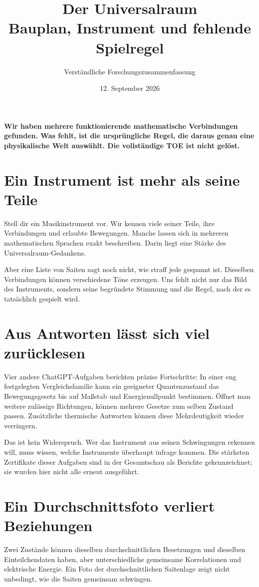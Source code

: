 \documentclass[10pt,a4paper]{article}
\title{Der Universalraum\\Bauplan, Instrument und fehlende Spielregel}
\author{Verständliche Forschungszusammenfassung}
\date{12. September 2026}
\begin{document}
\maketitle
\textbf{Wir haben mehrere funktionierende mathematische Verbindungen
gefunden. Was fehlt, ist die ursprüngliche Regel, die daraus genau eine
physikalische Welt auswählt. Die vollständige TOE ist nicht gelöst.}

\section*{Ein Instrument ist mehr als seine Teile}
Stell dir ein Musikinstrument vor. Wir kennen viele seiner Teile, ihre
Verbindungen und erlaubte Bewegungen. Manche lassen sich in mehreren
mathematischen Sprachen exakt beschreiben. Darin liegt eine Stärke des
Universalraum-Gedankens.

Aber eine Liste von Saiten sagt noch nicht, wie straff jede gespannt ist.
Dieselben Verbindungen können verschiedene Töne erzeugen. Uns fehlt nicht
nur das Bild des Instruments, sondern seine begründete Stimmung und die
Regel, nach der es tatsächlich gespielt wird.

\section*{Aus Antworten lässt sich viel zurücklesen}
Vier andere ChatGPT-Aufgaben berichten präzise Fortschritte: In einer eng
festgelegten Vergleichsfamilie kann ein geeigneter Quantenzustand das
Bewegungsgesetz bis auf Maßstab und Energienullpunkt bestimmen. Öffnet man
weitere zulässige Richtungen, können mehrere Gesetze zum selben Zustand
passen. Zusätzliche thermische Antworten können diese Mehrdeutigkeit wieder
verringern.

Das ist kein Widerspruch. Wer das Instrument aus seinen Schwingungen
erkennen will, muss wissen, welche Instrumente überhaupt infrage kommen.
Die stärksten Zertifikate dieser Aufgaben sind in der Gesamtschau als
Berichte gekennzeichnet; sie wurden hier nicht alle erneut ausgeführt.

\section*{Ein Durchschnittsfoto verliert Beziehungen}
Zwei Zustände können dieselben durchschnittlichen Besetzungen und dieselben
Einteilchendaten haben, aber unterschiedliche gemeinsame Korrelationen und
elektrische Energie. Ein Foto der durchschnittlichen Saitenlage zeigt nicht
unbedingt, wie die Saiten gemeinsam schwingen.
\end{document}
